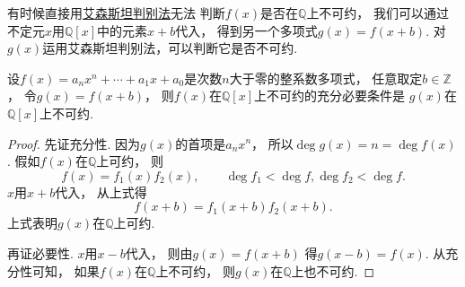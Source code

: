 有时候直接用\hyperref[theorem:多项式.有理数域上的不可约多项式.艾森斯坦判别法]{艾森斯坦判别法}无法
判断\(f(x)\)是否在\(\mathbb{Q}\)上不可约，
我们可以通过不定元\(x\)用\(\mathbb{Q}[x]\)中的元素\(x+b\)代入，
得到另一个多项式\(g(x)=f(x+b)\).
对\(g(x)\)运用艾森斯坦判别法，可以判断它是否不可约.
\begin{proposition}
设\(f(x)=a_n x^n+\dotsb+a_1 x+a_0\)是次数\(n\)大于零的整系数多项式，
任意取定\(b\in\mathbb{Z}\)，
令\(g(x)=f(x+b)\)，
则\(f(x)\)在\(\mathbb{Q}[x]\)上不可约的充分必要条件是
\(g(x)\)在\(\mathbb{Q}[x]\)上不可约.
\begin{proof}
先证充分性.
因为\(g(x)\)的首项是\(a_n x^n\)，
所以\(\deg g(x)=n=\deg f(x)\).
假如\(f(x)\)在\(\mathbb{Q}\)上可约，
则\[
	f(x)=f_1(x) f_2(x), \qquad
	\deg f_1 < \deg f,
	\deg f_2 < \deg f.
\]
\(x\)用\(x+b\)代入，
从上式得\[
	f(x+b)=f_1(x+b) f_2(x+b).
\]
上式表明\(g(x)\)在\(\mathbb{Q}\)上可约.

再证必要性.
\(x\)用\(x-b\)代入，
则由\(g(x)=f(x+b)\)
得\(g(x-b)=f(x)\).
从充分性可知，
如果\(f(x)\)在\(\mathbb{Q}\)上不可约，
则\(g(x)\)在\(\mathbb{Q}\)上也不可约.
\end{proof}
\end{proposition}
